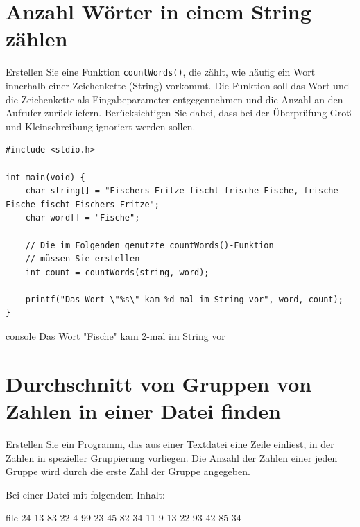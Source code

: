 \chapter{Anzahl Wörter in einem String zählen}

\vspace{10pt}

Erstellen Sie eine Funktion \texttt{countWords()}, die zählt, wie häufig
ein Wort innerhalb einer Zeichenkette (String) vorkommt. Die Funktion soll das
Wort und die Zeichenkette als Eingabeparameter entgegennehmen und die Anzahl an
den Aufrufer zurückliefern. Berücksichtigen Sie dabei, dass bei der Überprüfung
Groß- und Kleinschreibung ignoriert werden sollen.

\Vorlage
\begin{verbatim}
#include <stdio.h>

int main(void) {
    char string[] = "Fischers Fritze fischt frische Fische, frische Fische fischt Fischers Fritze";
    char word[] = "Fische";

    // Die im Folgenden genutzte countWords()-Funktion
    // müssen Sie erstellen
    int count = countWords(string, word);

    printf("Das Wort \"%s\" kam %d-mal im String vor", word, count);
}
\end{verbatim}

\begin{mybox}[Bildschirmausgabe]{console}
Das Wort "Fische" kam 2-mal im String vor
\end{mybox}



\chapter{Durchschnitt von Gruppen von Zahlen in einer Datei finden}

\vspace{10pt}

Erstellen Sie ein Programm, das aus einer Textdatei eine Zeile einliest, in der
Zahlen in spezieller Gruppierung vorliegen. Die Anzahl der Zahlen einer jeden
Gruppe wird durch die erste Zahl der Gruppe angegeben.

Bei einer Datei mit folgendem Inhalt:

\begin{mybox}{file}
 24 13 83 22 4  99 23 45  82 34 11 9  13 22 93 42 85 34
\end{mybox}

